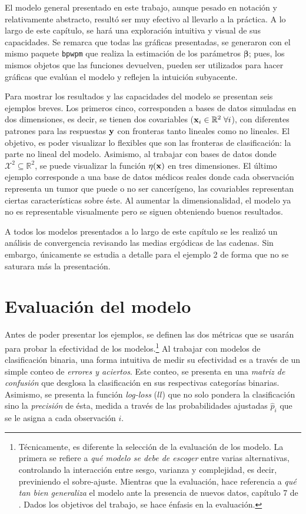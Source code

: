 \documentclass[../Main/Main.tex]{subfiles}
\begin{document}
El modelo general presentado en este trabajo, aunque pesado en notación y relativamente abstracto, resultó ser muy efectivo al llevarlo a la práctica. A lo largo de este capítulo, se hará una exploración intuitiva y visual de sus capacidades. Se remarca que todas las gráficas presentadas, se generaron con el mismo paquete \verb|bpwpm| que realiza la estimación de los parámetros $\bm{\beta}$; pues, los mismos objetos que las funciones devuelven, pueden ser utilizados para hacer gráficas que evalúan el modelo y reflejen la intuición subyacente. 

Para mostrar los resultados y las capacidades del modelo se presentan seis ejemplos breves. Los primeros cinco, corresponden a bases de datos simuladas en dos dimensiones, es decir, se tienen dos covariables ($\mathbf{x}_i\in\mathbb{R}^2 \;\forall i$),  con diferentes patrones para las respuestas $\mathbf{y}$ con fronteras tanto lineales como no lineales. El objetivo, es poder visualizar lo flexibles que son las fronteras de clasificación: la parte no lineal del modelo. Asimismo, al trabajar con bases de datos donde $\mathcal{X}^2\subseteq\mathbb{R}^2$, se puede visualizar la función $\eta(\mathbf{x})$ en tres dimensiones. El último ejemplo corresponde a una base de datos médicos reales donde cada observación representa un tumor que puede o no ser cancerígeno, las covariables representan ciertas características sobre éste. Al aumentar la dimensionalidad, el modelo ya no es representable visualmente pero se siguen obteniendo buenos resultados.

A todos los modelos presentados a lo largo de este capítulo se les realizó un análisis de convergencia revisando las medias ergódicas de las cadenas. Sin embargo, únicamente se estudia a detalle para el ejemplo 2 de forma que no se saturara más la presentación.

\section{Evaluación del modelo}
Antes de poder presentar los ejemplos, se definen las dos métricas que se usarán para probar la efectividad de los modelos.\footnote{Técnicamente, es diferente la selección de la evaluación de los modelo. La primera se refiere a \textit{qué modelo se debe de escoger} entre varias alternativas, controlando la interacción entre sesgo, varianza  y complejidad, es decir, previniendo el sobre-ajuste. Mientras que la evaluación, hace referencia a \emph{qué tan bien generaliza} el modelo ante la presencia de nuevos datos, capítulo 7 de \citet{hastie2008elements}. Dados los objetivos del trabajo, se hace énfasis en la evaluación.} Al trabajar con modelos de clasificación binaria, una forma intuitiva de medir su efectividad es a través de un simple conteo de \textit{errores y aciertos}. Este conteo, se presenta en una \textit{matriz de confusión} que desglosa la clasificación en sus respectivas categorías binarias. Asimismo, se presenta la función \textit{log-loss} ($ll$) que no solo pondera la clasificación sino la \textit{precisión} de ésta, medida a través de las probabilidades ajustadas $\hat{p}_i$ que se le asigna a cada observación $i$.
\end{document}
